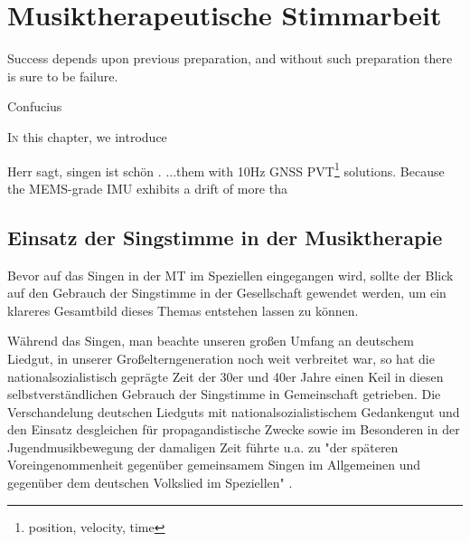 
\chapter{Musiktherapeutische Stimmarbeit}
\label{chapter:musiktherapeutische_stimmarbeit}
\setlength{\epigraphwidth}{8.0cm}
\epigraph{Success depends upon previous preparation, and without such preparation there is sure to be failure.}{Confucius}
\ifpdf
    \graphicspath{{3_musiktherapeutische_stimmarbeit/figures/PNG/}{3_musiktherapeutische_stimmarbeit/figures/PDF/}{3_musiktherapeutische_stimmarbeit/figures/}}
\else
    \graphicspath{{3_musiktherapeutische_stimmarbeit/figures/EPS/}{3_musiktherapeutische_stimmarbeit/figures/}}
\fi
\lettrine{I}{n} this chapter, we introduce 


Herr \autocite[vgl.][12]{wolf2012} sagt, singen ist schön \autocite[9]{wolf2012}.
...them with 10Hz GNSS PVT\footnote{position, velocity, time} solutions. Because the MEMS-grade IMU exhibits a drift of more tha


\section{Einsatz der Singstimme in der Musiktherapie}
Bevor auf das Singen in der MT im Speziellen eingegangen wird, sollte der Blick auf den Gebrauch der Singstimme in der Gesellschaft gewendet werden, um ein klareres Gesamtbild dieses Themas entstehen lassen zu können.

Während das Singen, man beachte unseren großen Umfang an deutschem Liedgut, in unserer Großelterngeneration noch weit verbreitet war, so hat die nationalsozialistisch geprägte Zeit der 30er und 40er Jahre einen Keil in diesen selbstverständlichen Gebrauch der Singstimme in Gemeinschaft getrieben.
Die Verschandelung deutschen Liedguts mit nationalsozialistischem Gedankengut und den Einsatz desgleichen für propagandistische Zwecke sowie im Besonderen in der Jugendmusikbewegung der damaligen Zeit führte u.a. zu "der späteren Voreingenommenheit gegenüber gemeinsamem Singen im Allgemeinen und gegenüber dem deutschen Volkslied im Speziellen" \autocite[9]{wolf2012}.

